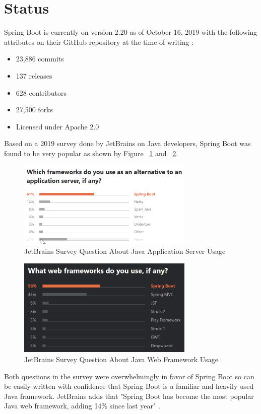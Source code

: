 \section{Status}

Spring Boot is currently on version 2.20 as of October 16, 2019 with the following attributes on their GitHub repository at the time of writing \cite{github:online}:

\begin{itemize}
\item 23,886 commits
\item 137 releases
\item 628 contributors
\item 27,500 forks
\item Licensed under Apache 2.0
\end{itemize}

Based on a 2019 survey done by JetBrains on Java developers, Spring Boot was found to be very popular as shown by Figure ~\ref{fig:jb-survey-app-server} and ~\ref{fig:jb-survey-web-framework}.

\begin{figure}[H]
    \centering
    \includegraphics[width=0.75\textwidth]{content/introduction/jb-survey-app-server.png}
    \caption{JetBrains Survey Question About Java Application Server Usage \protect\cite{jetbrains:online}}
    \label{fig:jb-survey-app-server}
\end{figure}

\begin{figure}[H]
    \centering
    \includegraphics[width=0.75\textwidth]{content/introduction/jb-survey-web-framework.png}
    \caption{JetBrains Survey Question About Java Web Framework Usage \protect\cite{jetbrains:online}}
    \label{fig:jb-survey-web-framework}
\end{figure}

Both questions in the survey were overwhelmingly in favor of Spring Boot so can be easily written with confidence that Spring Boot is a familiar and heavily used Java framework. JetBrains adds that "Spring Boot has become the most popular Java web framework, adding 14\% since last year" \cite{jetbrains:online}.

